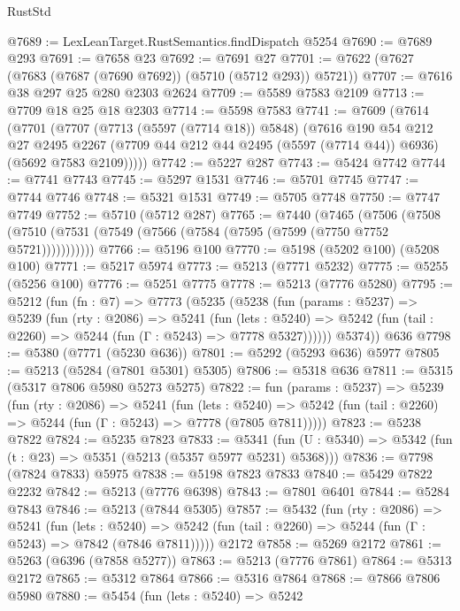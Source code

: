 \begin{lexlean}{RustStd}
\begin{coremodule}
@7689 := LexLeanTarget.RustSemantics.findDispatch @5254
@7690 := @7689 @293
@7691 := @7658 @23
@7692 := @7691 @27
@7701 := @7622 (@7627 (@7683 (@7687 (@7690 @7692)) (@5710 (@5712 @293)) @5721))
@7707 := @7616 @38 @297 @25 @280 @2303 @2624
@7709 := @5589 @7583 @2109
@7713 := @7709 @18 @25 @18 @2303
@7714 := @5598 @7583
@7741 := @7609
    (@7614
      (@7701
        (@7707
          (@7713 (@5597 (@7714 @18)) @5848)
          (@7616
            @190
            @54
            @212
            @27
            @2495
            @2267
            (@7709 @44 @212 @44 @2495 (@5597 (@7714 @44)) @6936)
            (@5692 @7583 @2109)))))
@7742 := @5227 @287
@7743 := @5424 @7742
@7744 := @7741 @7743
@7745 := @5297 @1531
@7746 := @5701 @7745
@7747 := @7744 @7746
@7748 := @5321 @1531
@7749 := @5705 @7748
@7750 := @7747 @7749
@7752 := @5710 (@5712 @287)
@7765 := @7440
    (@7465
      (@7506 (@7508 (@7510 (@7531 (@7549 (@7566 (@7584 (@7595 (@7599 (@7750 @7752 @5721)))))))))))
@7766 := @5196 @100
@7770 := @5198 (@5202 @100) (@5208 @100)
@7771 := @5217 @5974
@7773 := @5213 (@7771 @5232)
@7775 := @5255 (@5256 @100)
@7776 := @5251 @7775
@7778 := @5213 (@7776 @5280)
@7795 := @5212
    (fun (fn : @7) =>
    @7773
      (@5235
        (@5238
          (fun (params : @5237) =>
          @5239
            (fun (rty : @2086) =>
            @5241
              (fun (lets : @5240) =>
              @5242 (fun (tail : @2260) => @5244 (fun (Γ : @5243) => @7778 @5327))))))
        @5374))
    @636
@7798 := @5380 (@7771 (@5230 @636))
@7801 := @5292 (@5293 @636) @5977
@7805 := @5213 (@5284 (@7801 @5301) @5305)
@7806 := @5318 @636
@7811 := @5315 (@5317 @7806 @5980 @5273 @5275)
@7822 := fun (params : @5237) =>
  @5239
    (fun (rty : @2086) =>
    @5241
      (fun (lets : @5240) =>
      @5242 (fun (tail : @2260) => @5244 (fun (Γ : @5243) => @7778 (@7805 @7811)))))
@7823 := @5238 @7822
@7824 := @5235 @7823
@7833 := @5341 (fun (U : @5340) => @5342 (fun (t : @23) => @5351 (@5213 (@5357 @5977 @5231) @5368)))
@7836 := @7798 (@7824 @7833) @5975
@7838 := @5198 @7823 @7833
@7840 := @5429 @7822 @2232
@7842 := @5213 (@7776 @6398)
@7843 := @7801 @6401
@7844 := @5284 @7843
@7846 := @5213 (@7844 @5305)
@7857 := @5432
    (fun (rty : @2086) =>
    @5241
      (fun (lets : @5240) =>
      @5242 (fun (tail : @2260) => @5244 (fun (Γ : @5243) => @7842 (@7846 @7811)))))
    @2172
@7858 := @5269 @2172
@7861 := @5263 (@6396 (@7858 @5277))
@7863 := @5213 (@7776 @7861)
@7864 := @5313 @2172
@7865 := @5312 @7864
@7866 := @5316 @7864
@7868 := @7866 @7806 @5980
@7880 := @5454
    (fun (lets : @5240) =>
    @5242

\end{coremodule}
\end{lexlean}
